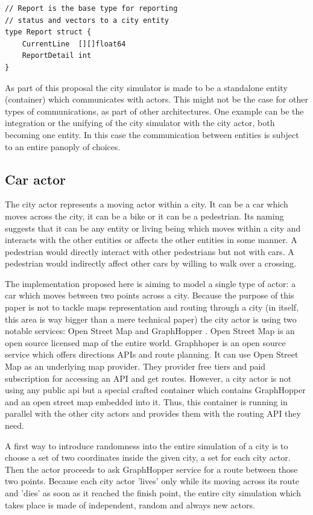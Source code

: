 \documentclass[conference]{IEEEtran}
\begin{document}
\begin{lstlisting}[caption=Go struct for actor's report, label=lst:goactorstruct]
// Report is the base type for reporting
// status and vectors to a city entity
type Report struct {
	CurrentLine  [][]float64
	ReportDetail int
}
\end{lstlisting}

As part of this proposal the city simulator is made to be a standalone entity (container) which communicates with actors. This might not be the case for other types of communications, as part of other architectures. One example can be the integration or the unifying of the city simulator with the city actor, both becoming one entity. In this case the communication between entities is subject to an entire panoply of choices.

\subsection{Car actor}

The city actor represents a moving actor within a city. It can be a car which moves across the city, it can be a bike or it can be a pedestrian. Its naming suggests that it can be any entity or living being which moves within a city and interacts with the other entities or affects the other entities in some manner. A pedestrian would directly interact with other pedestrians but not with cars. A pedestrian would indirectly affect other cars by willing to walk over a crossing.

The implementation proposed here is aiming to model a single type of actor: a car which moves between two points across a city. Because the purpose of this paper is not to tackle maps representation and routing through a city (in itself, this area is way bigger than a mere technical paper) the city actor is using two notable services: Open Street Map \cite{openstreetmap} and GraphHopper \cite{graphhopper}. Open Street Map is an open source licensed map of the entire world. Graphhoper is an open source service which offers directions APIs and route planning. It can use Open Street Map as an underlying map provider. They provider free tiers and paid subscription for accessing an API and get routes. However, a city actor is not using any public api but a special crafted container which contains GraphHopper and an open street map embedded into it. Thus, this container is running in parallel with the other city actors and provides them with the routing API they need.

A first way to introduce randomness into the entire simulation of a city is to choose a set of two coordinates inside the given city, a set for each city actor. Then the actor proceeds to ask GraphHopper service for a route between those two points. Because each city actor 'lives' only while its moving across its route and 'dies' as soon as it reached the finish point, the entire city simulation which takes place is made of independent, random and always new actors.
\end{document}
